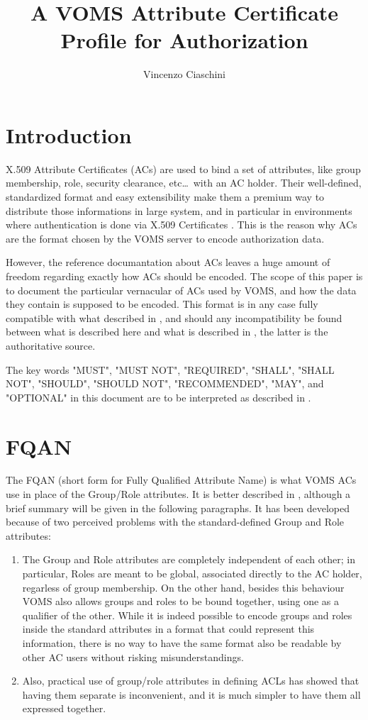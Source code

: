\documentclass[a4]{article}
\title{A VOMS Attribute Certificate\\ Profile for Authorization}
\author{Vincenzo Ciaschini}
\begin{document}
\maketitle
\tableofcontents
\newpage
\section{Introduction}
X.509 Attribute Certificates (ACs) \cite{rfc3281} are used to bind a
set of attributes, like group membership, role, security clearance,
etc\ldots\ with an AC holder.  Their well-defined, standardized format
and easy extensibility make them a premium way to distribute those
informations in large system, and in particular in environments where
authentication is done via X.509 Certificates \cite{rfc3280}.  This is
the reason why ACs are the format chosen by the VOMS server
\cite{voms} to encode authorization data.

However, the reference documantation about ACs leaves a huge amount of
freedom regarding exactly how ACs should be encoded. The scope of this
paper is to document the particular vernacular of ACs used by VOMS,
and how the data they contain is supposed to be encoded.  This format
is in any case fully compatible with what described in \cite{rfc3281},
and should any incompatibility be found between what is described here
and what is described in \cite{rfc3281}, the latter is the
authoritative source.

The key words "MUST", "MUST NOT", "REQUIRED", "SHALL", "SHALL NOT",
"SHOULD", "SHOULD NOT", "RECOMMENDED", "MAY", and "OPTIONAL" in this
document are to be interpreted as described in \cite{rfc2119}.

\section{FQAN}
The FQAN (short form for Fully Qualified Attribute Name) is what VOMS
ACs use in place of the Group/Role attributes. It is better described
in \cite{fqan}, although a brief summary will be given in the
following paragraphs.  It has been developed because of two perceived
problems with the standard-defined\cite{rfc3281} Group and Role
attributes:

\begin{enumerate}
\item The Group and Role attributes are completely independent of each
other; in particular, Roles are meant to be global, associated
directly to the AC holder, regarless of group membership. On the other
hand, besides this behaviour VOMS also allows groups and roles to be
bound together, using one as a qualifier of the other.  While it is
indeed possible to encode groups and roles inside the standard
attributes in a format that could represent this information, there is
no way to have the same format also be readable by other AC users
without risking misunderstandings.
\item Also, practical use of group/role attributes in defining ACLs
has showed that having them separate is inconvenient, and it is much
simpler to have them all expressed together.
\end{enumerate}
\end{document}
